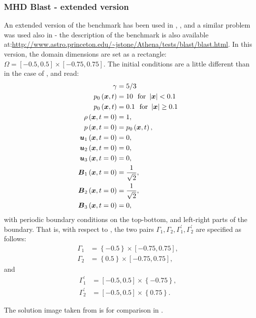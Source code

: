 \subsubsection{MHD Blast - extended version}
\label{sec:blastNew}
An extended version of the benchmark has been used in \cite{blastNew1}, \cite{athenaBlast}, and a similar problem was used also in \cite{blastNew2} - the description of the benchmark is also available at:\url{http://www.astro.princeton.edu/~jstone/Athena/tests/blast/blast.html}.
In this version, the domain dimensions are set as a rectangle: $\Omega = [-0.5, 0.5] \times [-0.75, 0.75]$.
The initial conditions are a little different than in the case of , and read:
\begin{align}
\label{mhdBlastNew}
\gamma & =  5 / 3\\ \nonumber
p_0\left(\mbox{\boldmath $x$}, t\right) & =  10\ \ \text{for}\ \left|\mbox{\boldmath $x$}\right| < 0.1\\ \nonumber
p_0\left(\mbox{\boldmath $x$}, t\right) & =  0.1\ \ \text{for}\ \left|\mbox{\boldmath $x$}\right| \geq 0.1\\ \nonumber
\rho\left(\mbox{\boldmath $x$}, t = 0\right) & =  1,\\ \nonumber
p\left(\mbox{\boldmath $x$}, t = 0\right) & =  p_0\left(\mbox{\boldmath $x$}, t\right),\\ \nonumber
\mbox{\boldmath $u$}_1\left(\mbox{\boldmath $x$}, t = 0\right) & =  0,\\ \nonumber
\mbox{\boldmath $u$}_2\left(\mbox{\boldmath $x$}, t = 0\right) & =  0,\\ \nonumber
\mbox{\boldmath $u$}_3\left(\mbox{\boldmath $x$}, t = 0\right) & =  0,\\ \nonumber
\mbox{\boldmath $B$}_1\left(\mbox{\boldmath $x$}, t = 0\right) & =  \frac{1}{\sqrt{2}},\\ \nonumber
\mbox{\boldmath $B$}_2\left(\mbox{\boldmath $x$}, t = 0\right) & =  \frac{1}{\sqrt{2}},\\ \nonumber
\mbox{\boldmath $B$}_3\left(\mbox{\boldmath $x$}, t = 0\right) & =  0,
\end{align}
with periodic boundary conditions on the top-bottom, and left-right parts of the boundary. That is, with respect to , the two pairs $\Gamma_1, \Gamma_2, \Gamma_1^{'}, \Gamma_2^{'}$ are specified as follows:
\begin{align}
\Gamma_1 & = \left\{-0.5\right\} \times [-0.75, 0.75],\\
\Gamma_2 & = \left\{0.5\right\} \times [-0.75, 0.75],
\end{align}
and
\begin{align}
\Gamma_1^{'} & = [-0.5, 0.5] \times \left\{-0.75\right\},\\
\Gamma_2^{'} & = [-0.5, 0.5] \times \left\{0.75\right\}.
\end{align}

The solution image taken from \cite{blastNew1} is for comparison in .

